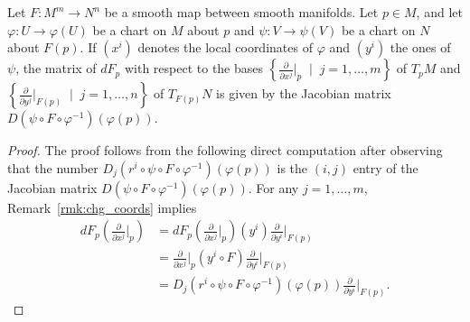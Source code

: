 \begin{proposition}\label{prop:DiffCoords}
  Let $F:M^m\to N^n$ be a smooth map between smooth manifolds.
  Let $p\in M$, and let $\varphi : U \to \varphi(U)$ be a chart on $M$ about $p$ and $\psi: V \to \psi(V)$ be a chart on $N$ about $F(p)$.
  If $(x^i)$ denotes the local coordinates of $\varphi$ and $(y^i)$ the ones of $\psi$, the matrix of $dF_p$ with respect to the bases $\left\{\frac{\partial}{\partial x^j}\big|_p \;\mid\; j=1,\ldots,m\right\}$ of $T_pM$ and $\left\{\frac{\partial}{\partial y^j}\big|_{F(p)} \;\mid\; j=1,\ldots,n\right\}$ of $T_{F(p)}N$ is given by the Jacobian matrix $D(\psi\circ F \circ\varphi^{-1})(\varphi(p))$.
\end{proposition}
\begin{proof}
  The proof follows from the following direct computation after observing that the number $D_j(r^i \circ \psi \circ F \circ \varphi^{-1})(\varphi(p))$ is the $(i,j)$ entry of the Jacobian matrix $D(\psi\circ F \circ\varphi^{-1})(\varphi(p))$. For any $j=1,\ldots,m$, Remark~\ref{rmk:chg_coords} implies
  \begin{align}
    dF_p \left(\frac{\partial}{\partial x^j}\Big|_p\right)
     & =                                                                                                   %
    dF_p \left(\frac{\partial}{\partial x^j}\Big|_p\right) (y^i) \frac{\partial}{\partial y^i}\Big|_{F(p)} \\
     & =                                                                                                   %
    \frac{\partial}{\partial x^j}\Big|_p (y^i \circ F) \frac{\partial}{\partial y^i}\Big|_{F(p)}           \\
     & =                                                                                                   %
    D_j(r^i \circ \psi \circ F \circ \varphi^{-1})(\varphi(p)) \frac{\partial}{\partial y^i}\Big|_{F(p)}.
  \end{align}
\end{proof}

